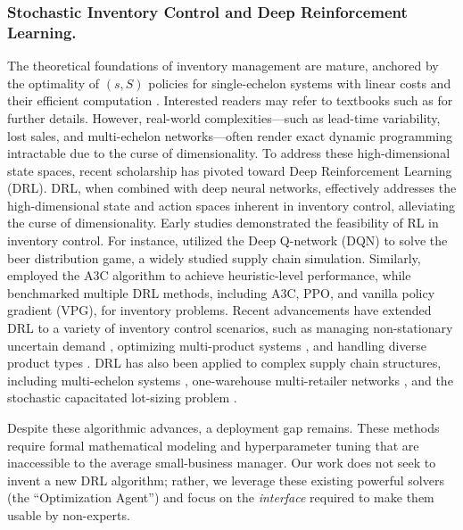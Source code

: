 \documentclass[mnsc,nonblindrev]{informs3_hide}
\begin{document}
\subsubsection{Stochastic Inventory Control and Deep Reinforcement Learning.}
The theoretical foundations of inventory management are mature, anchored by the optimality of $(s, S)$ policies for single-echelon systems with linear costs \citep{scarf1960optimality} and their efficient computation \citep{axsater2006inventory}. Interested readers may refer to textbooks such as \cite{simchi2005logic} for further details. However, real-world complexities—such as lead-time variability, lost sales, and multi-echelon networks—often render exact dynamic programming intractable due to the curse of dimensionality.
To address these high-dimensional state spaces, recent scholarship has pivoted toward Deep Reinforcement Learning (DRL). DRL, when combined with deep neural networks, effectively addresses the high-dimensional state and action spaces inherent in inventory control, alleviating the curse of dimensionality. Early studies demonstrated the feasibility of RL in inventory control. For instance, \cite{oroojlooyjadid2022deep} utilized the Deep Q-network (DQN) to solve the beer distribution game, a widely studied supply chain simulation. Similarly, \cite{gijsbrechts2022can} employed the A3C algorithm to achieve heuristic-level performance, while \cite{stranieri2023comparing} benchmarked multiple DRL methods, including A3C, PPO, and vanilla policy gradient (VPG), for inventory problems. Recent advancements have extended DRL to a variety of inventory control scenarios, such as managing non-stationary uncertain demand \citep{dehaybe2024deep, park2023adaptive}, optimizing multi-product systems \citep{sultana2020reinforcement, selukar2022inventory}, and handling diverse product types \citep{meisheri2020using, meisheri2022scalable}. DRL has also been applied to complex supply chain structures, including multi-echelon systems \citep{wu2023distributional, alvo2023neural, liu2024reinforcement, stranieri2024combining}, one-warehouse multi-retailer networks \citep{kaynov2024deep}, and the stochastic capacitated lot-sizing problem \citep{van2023using}.



Despite these algorithmic advances, a deployment gap remains. These methods require formal mathematical modeling and hyperparameter tuning that are inaccessible to the average small-business manager. Our work does not seek to invent a new DRL algorithm; rather, we leverage these existing powerful solvers (the ``Optimization Agent'') and focus on the \emph{interface} required to make them usable by non-experts.
\end{document}
